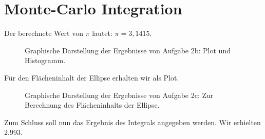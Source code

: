 \section*{Monte-Carlo Integration}
Der berechnete Wert von $\pi$ lautet: $\pi = 3,1415$.

\begin{landscape}
	\begin{figure}
		\caption{Graphische Darstellung der Ergebnisse von Aufgabe 2b: Plot und Histogramm.}
		\label{fig:2b}
	\end{figure}
\end{landscape}

Für den Flächeninhalt der Ellipse erhalten wir als Plot.
\begin{landscape}
	\begin{figure}
		\caption{Graphische Darstellung der Ergebnisse von Aufgabe 2c: Zur Berechnung des Flächeninhalts der Ellipse.}
		\label{fig:1b}
	\end{figure}
\end{landscape}

Zum Schluss soll nun das Ergebnis des Integrals angegeben werden. Wir erhielten 2.993.


